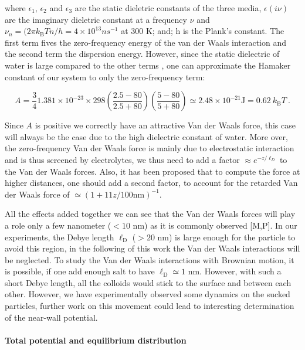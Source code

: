 where $\epsilon_1$, $\epsilon_2$ and $\epsilon_3$ are the static dieletric constants of the three media, $\epsilon (i\nu)$ are the imaginary dieletric constant at a frequency $\nu$ and $\nu_n = (2 \pi k_\mathrm{B}Tn/h = 4 \times 10^{13} n s^{-1}$ at $300$ K; and; h is the Plank's constant. The first term fives the zero-frequency energy of the van der Waals interaction and the second term the dispersion energy.
However, since the static dielectric of water is large compared to the other terms \cite{israelachvili_intermolecular_2015}, one can approximate the Hamaker constant of our system to only the zero-frequency term:

\begin{equation}
	A = \frac{3}{4} 1.381 \times 10^{-23} \times 298 
	\left(
	\frac{2.5 - 80}{2.5 + 80}
	\right)
	\left(
	\frac{5 - 80}{5 + 80}
	\right)
	\simeq
	2.48 \times 10^{-21} \mathrm{J}	= 0.62 ~ k_\mathrm{B}T ~.
\end{equation}

Since $A$ is positive we correctly have an attractive Van der Waals force, this case will always be the case due to the high dielectric constant of water. More over, the zero-frequency Van der Waals force is mainly due to electrostatic interaction and is thus screened by electrolytes, we thus need to add a factor $\approx e^{-z/\ell_D}$ to the Van der Waals forces. Also, it has been proposed \cite{gregory_approximate_1981} that to compute the force at higher distances, one should add a second factor, to account for the retarded Van der Waals force of $ \simeq (1  + 11z/100 \mathrm{nm})^{-1}$. 


All the effects added together we can see that the Van der Waals forces will play a role only a few nanometer ($< 10$ nm) as it is commonly observed [M,P]. In our experiments, the Debye length $\ell _\mathrm{D}$ ($>20$ nm) is large enough for the particle to avoid this region, in the following of this work the Van der Waals interactions will be neglected. To study the Van der Waals interactions with Brownian motion, it is possible, if one add enough salt to have $\ell_\mathrm{D} \simeq 1$ nm. However, with such a short Debye length, all the colloids would stick to the surface and between each other. However, we have experimentally observed some dynamics on the sucked particles, further work on this movement could lead to interesting determination of the near-wall potential. 

\newpage

\paragraph{Total potential and equilibrium distribution}\mbox{}\\
\vspace{0.10cm}

